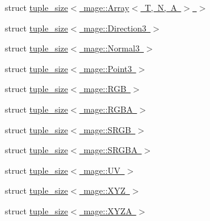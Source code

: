 \begin{DoxyCompactItemize}
struct \mbox{\hyperlink{structstd_1_1tuple__size_3_01mage_1_1_array_3_01_t_00_01_n_00_01_a_01_4_01_4}{tuple\+\_\+size$<$ mage\+::\+Array$<$ T, N, A $>$ $>$}}
\item 
struct \mbox{\hyperlink{structstd_1_1tuple__size_3_01mage_1_1_direction3_01_4}{tuple\+\_\+size$<$ mage\+::\+Direction3 $>$}}
\item 
struct \mbox{\hyperlink{structstd_1_1tuple__size_3_01mage_1_1_normal3_01_4}{tuple\+\_\+size$<$ mage\+::\+Normal3 $>$}}
\item 
struct \mbox{\hyperlink{structstd_1_1tuple__size_3_01mage_1_1_point3_01_4}{tuple\+\_\+size$<$ mage\+::\+Point3 $>$}}
\item 
struct \mbox{\hyperlink{structstd_1_1tuple__size_3_01mage_1_1_r_g_b_01_4}{tuple\+\_\+size$<$ mage\+::\+R\+G\+B $>$}}
\item 
struct \mbox{\hyperlink{structstd_1_1tuple__size_3_01mage_1_1_r_g_b_a_01_4}{tuple\+\_\+size$<$ mage\+::\+R\+G\+B\+A $>$}}
\item 
struct \mbox{\hyperlink{structstd_1_1tuple__size_3_01mage_1_1_s_r_g_b_01_4}{tuple\+\_\+size$<$ mage\+::\+S\+R\+G\+B $>$}}
\item 
struct \mbox{\hyperlink{structstd_1_1tuple__size_3_01mage_1_1_s_r_g_b_a_01_4}{tuple\+\_\+size$<$ mage\+::\+S\+R\+G\+B\+A $>$}}
\item 
struct \mbox{\hyperlink{structstd_1_1tuple__size_3_01mage_1_1_u_v_01_4}{tuple\+\_\+size$<$ mage\+::\+U\+V $>$}}
\item 
struct \mbox{\hyperlink{structstd_1_1tuple__size_3_01mage_1_1_x_y_z_01_4}{tuple\+\_\+size$<$ mage\+::\+X\+Y\+Z $>$}}
\item 
struct \mbox{\hyperlink{structstd_1_1tuple__size_3_01mage_1_1_x_y_z_a_01_4}{tuple\+\_\+size$<$ mage\+::\+X\+Y\+Z\+A $>$}}
\end{DoxyCompactItemize}
